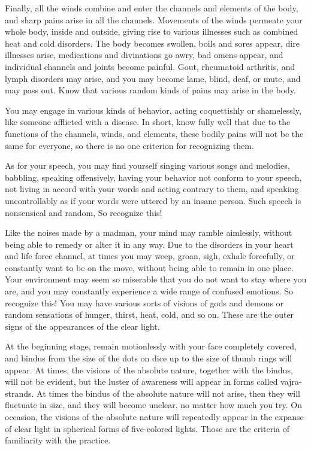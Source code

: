 \documentclass[11pt,twocolumn]{article}
\begin{document}
Finally, all the winds combine and enter the channels and elements of
the body, and sharp pains arise in all the channels. Movements of the
winds permeate your whole body, inside and outside, giving rise to
various illnesses such as combined heat and cold disorders. The body
becomes swollen, boils and sores appear, dire illnesses arise,
medications and divinations go awry, bad omens appear, and individual
channels and joints become painful. Gout, rheumatoid arthritis, and
lymph disorders may arise, and you may become lame, blind, deaf, or
mute, and may pass out. Know that various random kinds of pains may
arise in the body.

You may engage in various kinds of behavior, acting coquettishly or
shamelessly, like someone afflicted with a disease. In short, know
fully well that due to the functions of the channels, winds, and
elements, these bodily pains will not be the same for everyone, so
there is no one criterion for recognizing them.

As for your speech, you may find yourself singing various songs and
melodies, babbling, speaking offensively, having your behavior not
conform to your speech, not living in accord with your words and
acting contrary to them, and speaking uncontrollably as if your words
were uttered by an insane person. Such speech is nonsensical and
random, So recognize this!

Like the noises made by a madman, your mind may ramble aimlessly,
without being able to remedy or alter it in any way. Due to the
disorders in your heart and life force channel, at times you may weep,
groan, sigh, exhale forcefully, or constantly want to be on the move,
without being able to remain in one place. Your environment may seem
so miserable that you do not want to stay where you are, and you may
constantly experience a wide range of confused emotions. So recognize
this! You may have various sorts of visions of gods and demons or
random sensations of hunger, thirst, heat, cold, and so on. These are
the outer signs of the appearances of the clear light.

At the beginning stage, remain motionlessly with your face completely
covered, and bindus from the size of the dots on dice up to the size
of thumb rings will appear. At times, the visions of the absolute
nature, together with the bindus, will not be evident, but the luster
of awareness will appear in forms called vajra\hyp{}strands. At times
the bindus of the absolute nature will not arise, then they will
fluctuate in size, and they will become unclear, no matter how much
you try. On occasion, the visions of the absolute nature will
repeatedly appear in the expanse of clear light in spherical forms of
five\hyp{}colored lights. Those are the criteria of familiarity with
the practice.
\end{document}

